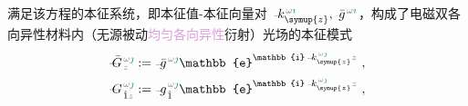 满足该方程的\textcolor{PineGreen}{本征系统}，即\textcolor{PineGreen}{本征值}-\textcolor{PineGreen}{本征向量}对 $\xint{\begin{smallmatrix} ~ \\ {}^{}_{\mathcolor{gray}{-}} \\ ~ \end{smallmatrix}}{15}{k}_{\symup{z}}^{\;\! \mathcolor{gray}{\omega} \textcolor{PineGreen}{\imath}}, \xint{{}^{}_{\mathcolor{gray}{-}}}{10}{\bar{g}}^{\;\!\mathcolor{gray}{\omega} \textcolor{PineGreen}{\imath}}$，构成了电磁\textcolor{PineGreen}{双各向异性}材料内（\textcolor{NavyBlue}{无源}\textcolor{NavyBlue}{被动}\textcolor{Plum}{均匀}\textcolor{Plum}{各向异性}衍射）光场的\textcolor{PineGreen}{本征模}式
\begin{subequations} \label{eq:polar_phase}
	\begin{align}
		\xint{\mathcolor{gray}{-}}{20}{\bar{G}}^{\;\!\mathcolor{gray}{\omega} \textcolor{PineGreen}{\jmath}}_{\;\! \mathcolor{gray}{z}} &:= \xint{{}^{}_{\mathcolor{gray}{-}}}{10}{\bar{g}}^{\;\!\mathcolor{gray}{\omega} \textcolor{PineGreen}{\jmath}} \mathbb{e}^{\mathbb{i} \xint{\begin{smallmatrix} ~ \\ {}^{}_{\mathcolor{gray}{-}} \\ ~ \end{smallmatrix}}{15}{k}_{\symup{z}}^{\;\! \mathcolor{gray}{\omega} \textcolor{PineGreen}{\jmath}} \mathcolor{gray}{z}} ~, \label{eq:vec-polar_phase} \\
		\xint{\mathcolor{gray}{-}}{20}{G}^{\;\!\mathcolor{gray}{\omega} \textcolor{PineGreen}{\jmath}}_{\;\! \hat{1} \mathcolor{gray}{z}} &:= \xint{{}^{}_{\mathcolor{gray}{-}}}{10}{g}^{\;\!\mathcolor{gray}{\omega} \textcolor{PineGreen}{\jmath}}_{\;\! \hat{1}} \mathbb{e}^{\mathbb{i} \xint{\begin{smallmatrix} ~ \\ {}^{}_{\mathcolor{gray}{-}} \\ ~ \end{smallmatrix}}{15}{k}_{\symup{z}}^{\;\! \mathcolor{gray}{\omega} \textcolor{PineGreen}{\jmath}} \mathcolor{gray}{z}} ~, \label{eq:components-polar_phase}
	\end{align}
\end{subequations}
